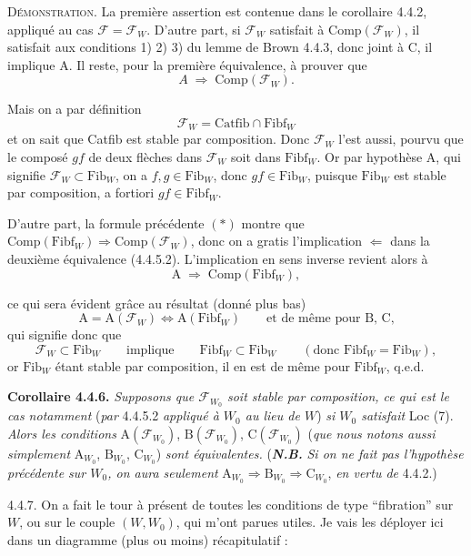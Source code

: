 \documentclass[11pt]{article}
\newcommand{\printedpage}[1]{\marginpar{\footnotesize p.~#1}}
\newcommand{\msp}[1]{\marginpar{\footnotesize [#1]}}
\newcommand{\cF}{\mathcal{F}}
\newcommand{\Fib}{\mathrm{Fib}}
\newcommand{\Fibf}{\mathrm{Fibf}}
\newcommand{\Comp}{\mathrm{Comp}}
\newcommand{\Catfib}{\mathrm{Catfib}}
\begin{document}
\printedpage{27}

\textsc{Démonstration}. La première assertion est contenue dans le corollaire 4.4.2, appliqué au cas $\cF = \cF_W$. D'autre part, si $\cF_W$ satisfait à $\Comp(\cF_W)$, il satisfait aux conditions 1) 2) 3) du lemme de Brown 4.4.3, donc joint à C, il implique A. Il reste, pour la première équivalence, à prouver que
\[
A \;\Longrightarrow\; \Comp(\cF_W).
\]

\msp{page 46}

Mais on a par définition
\[
\cF_W = \Catfib \cap \Fibf_W
\tag*{$(*)$}
\]
et on sait que Catfib est stable par composition. Donc $\cF_W$ l'est aussi, pourvu que le composé $gf$ de deux flèches dans $\cF_W$ soit dans $\Fibf_W$. Or par hypothèse A, qui signifie $\cF_W \subset \Fib_W$, on a $f, g \in \Fib_W$, donc $gf \in \Fib_W$, puisque $\Fib_W$ est stable par composition, a fortiori $gf \in \Fibf_W$.

D'autre part, la formule précédente $(*)$ montre que $\Comp(\Fibf_W) \Longrightarrow \Comp(\cF_W)$, donc on a gratis l'implication $\Longleftarrow$ dans la deuxième équivalence (4.4.5.2). L'implication en sens inverse revient alors à
\[
\mathrm{A} \;\Longrightarrow\; \Comp(\Fibf_W),
\]

\msp{page 47}

ce qui sera évident grâce au résultat (donné plus bas)
\[
\mathrm{A} = \mathrm{A}(\cF_W) \iff \mathrm{A}(\Fibf_W) \qquad \text{et de même pour B, C,}
\]
qui signifie donc que
\[
\cF_W \subset \Fib_W \qquad \text{implique} \qquad \Fibf_W \subset \Fib_W \qquad (\text{donc } \Fibf_W = \Fib_W),
\]
or $\Fib_W$ étant stable par composition, il en est de même pour $\Fibf_W$, q.e.d.

\textbf{Corollaire 4.4.6.} \textit{Supposons que $\cF_{W_0}$ soit stable par composition, ce qui est le cas notamment} (\textit{par} 4.4.5.2 \textit{appliqué à $W_0$ au lieu de $W$}) \textit{si $W_0$ satisfait} Loc (7). \textit{Alors les conditions} $\mathrm{A}(\cF_{W_0})$, $\mathrm{B}(\cF_{W_0})$, $\mathrm{C}(\cF_{W_0})$ (\textit{que nous notons aussi simplement} $\mathrm{A}_{W_0}$, $\mathrm{B}_{W_0}$, $\mathrm{C}_{W_0}$) \textit{sont équivalentes.} (\textbf{\textit{N.B.}} \textit{Si on ne fait pas l'hypothèse précédente sur $W_0$, on aura seulement} $\mathrm{A}_{W_0} \Longrightarrow \mathrm{B}_{W_0} \Longrightarrow \mathrm{C}_{W_0}$, \textit{en vertu de} 4.4.2.)

4.4.7. On a fait le tour à présent de toutes les conditions de type “fibration” sur $W$, ou sur le couple $(W, W_0)$, qui m'ont parues utiles. Je vais les déployer ici dans un diagramme (plus ou moins) récapitulatif : %
\end{document}
